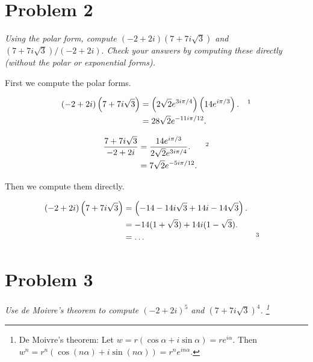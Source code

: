 \documentclass{tufte-handout}
\begin{document}
\section{Problem 2}
\begin{description}
\item \textit{Using the polar form, compute $(-2+2i)(7 + 7i\sqrt{3})$
    and $(7 + 7i\sqrt{3})/(-2 + 2i).$ Check your answers by computing
    these directly (without the polar or exponential forms).}
\end{description}

First we compute the polar forms.

\begin{align*}
  (-2 + 2i)\left(7 + 7i\sqrt 3\right) &= \left(2 \sqrt 2 e^{3i \pi /
                                        4}\right)\left(14e^{i\pi /
                                        3}\right). && \footnotemark \\
                                      &= 28 \sqrt 2 e^{-11i\pi / 12}.
\end{align*}

\begin{align*}
  {7 + 7i \sqrt 3 \over -2 + 2i} &= {14e^{i\pi / 3} \over 2 \sqrt 2
                                   e^{3i\pi / 4}}. && \footnotemark \\
                                 &= 7 \sqrt 2 e^{-5 i \pi / 12}.
\end{align*}

Then we compute them directly.

\begin{align*}
  (-2 + 2i)\left(7 + 7i\sqrt 3 \right) &= \left(-14 - 14 i \sqrt 3 + 14i
                                         -14 \sqrt 3\right).\\
                                       &= -14(1 + \sqrt 3) + 14i(1 -
                                         \sqrt 3).\\
                                       &= \ldots && \footnotemark
\end{align*}

\section{Problem 3}
\begin{description}
\item \textit{Use de Moivre's theorem to compute $(-2 + 2i)^5$ and $(7
    + 7i\sqrt 3)^4$. \footnote{De Moivre's theorem: Let $w = r(\cos\alpha + i\sin\alpha) = re^{i\alpha}.$ Then $w^n = r^n(\cos(n\alpha) + i\sin(n\alpha)) = r^n e^{in\alpha}$.}}
\end{description}
\end{document}

